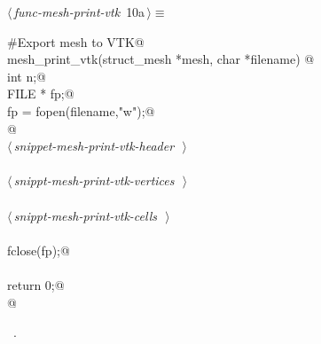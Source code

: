 \documentclass[a4paper,11pt]{article}
\begin{document}
\begin{flushleft} \small
\begin{minipage}{\linewidth}\label{scrap9}\raggedright\small
{} $\langle\,${\itshape func-mesh-print-vtk}\nobreak\ {\footnotesize {10a}}$\,\rangle\equiv$
\vspace{-1ex}
\begin{list}{}{} \item
\mbox{}\verb@#Export mesh to VTK@\\
\mbox{}\verb@int mesh_print_vtk(struct_mesh *mesh, char *filename) {@\\
\mbox{}\verb@    int n;@\\
\mbox{}\verb@    FILE * fp;@\\
\mbox{}\verb@    fp = fopen(filename,"w");@\\
\mbox{}\verb@    @\\
\mbox{}\verb@@\hbox{$\langle\,${\itshape snippet-mesh-print-vtk-header}\nobreak\ {\footnotesize {}}$\,\rangle$}\verb@@\\
\mbox{}\verb@@\\
\mbox{}\verb@@\hbox{$\langle\,${\itshape snippt-mesh-print-vtk-vertices}\nobreak\ {\footnotesize {}}$\,\rangle$}\verb@@\\
\mbox{}\verb@@\\
\mbox{}\verb@@\hbox{$\langle\,${\itshape snippt-mesh-print-vtk-cells}\nobreak\ {\footnotesize {}}$\,\rangle$}\verb@@\\
\mbox{}\verb@@\\
\mbox{}\verb@    fclose(fp);@\\
\mbox{}\verb@@\\
\mbox{}\verb@    return 0;@\\
\mbox{}\verb@    }@\\
\mbox{}\verb@@{\NWsep}
\end{list}
\vspace{-1.5ex}
\footnotesize
\begin{list}{}{\setlength{\itemsep}{-\parsep}\setlength{\itemindent}{-\leftmargin}}
\item \NWtxtMacroRefIn\ .

\item{}
\end{list}
\end{minipage}\vspace{4ex}
\end{flushleft}
\end{document}
